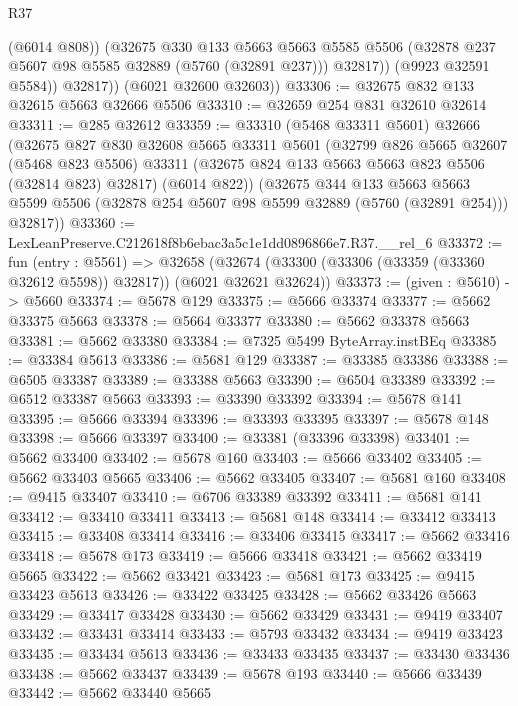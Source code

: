 \begin{lexlean}{R37}
\begin{coremodule}
                (@6014 @808))
              (@32675
                @330
                @133
                @5663
                @5663
                @5585
                @5506
                (@32878 @237 @5607 @98 @5585 @32889 (@5760 (@32891 @237)))
                @32817))
            (@9923 @32591 @5584))
          @32817))
      (@6021 @32600 @32603))
@33306 := @32675 @832 @133 @32615 @5663 @32666 @5506
@33310 := @32659 @254 @831 @32610 @32614
@33311 := @285 @32612
@33359 := @33310
    (@5468 @33311 @5601)
    @32666
    (@32675
      @827
      @830
      @32608
      @5665
      @33311
      @5601
      (@32799
        @826
        @5665
        @32607
        (@5468 @823 @5506)
        @33311
        (@32675 @824 @133 @5663 @5663 @823 @5506 (@32814 @823) @32817)
        (@6014 @822))
      (@32675
        @344
        @133
        @5663
        @5663
        @5599
        @5506
        (@32878 @254 @5607 @98 @5599 @32889 (@5760 (@32891 @254)))
        @32817))
@33360 := LexLeanPreserve.C212618f8b6ebac3a5c1e1dd0896866e7.R37.__rel_6
@33372 := fun (entry : @5561) =>
  @32658 (@32674 (@33300 (@33306 (@33359 (@33360 @32612 @5598)) @32817)) (@6021 @32621 @32624))
@33373 := (given : @5610) -> @5660
@33374 := @5678 @129
@33375 := @5666 @33374
@33377 := @5662 @33375 @5663
@33378 := @5664 @33377
@33380 := @5662 @33378 @5663
@33381 := @5662 @33380
@33384 := @7325 @5499 ByteArray.instBEq
@33385 := @33384 @5613
@33386 := @5681 @129
@33387 := @33385 @33386
@33388 := @6505 @33387
@33389 := @33388 @5663
@33390 := @6504 @33389
@33392 := @6512 @33387 @5663
@33393 := @33390 @33392
@33394 := @5678 @141
@33395 := @5666 @33394
@33396 := @33393 @33395
@33397 := @5678 @148
@33398 := @5666 @33397
@33400 := @33381 (@33396 @33398)
@33401 := @5662 @33400
@33402 := @5678 @160
@33403 := @5666 @33402
@33405 := @5662 @33403 @5665
@33406 := @5662 @33405
@33407 := @5681 @160
@33408 := @9415 @33407
@33410 := @6706 @33389 @33392
@33411 := @5681 @141
@33412 := @33410 @33411
@33413 := @5681 @148
@33414 := @33412 @33413
@33415 := @33408 @33414
@33416 := @33406 @33415
@33417 := @5662 @33416
@33418 := @5678 @173
@33419 := @5666 @33418
@33421 := @5662 @33419 @5665
@33422 := @5662 @33421
@33423 := @5681 @173
@33425 := @9415 @33423 @5613
@33426 := @33422 @33425
@33428 := @5662 @33426 @5663
@33429 := @33417 @33428
@33430 := @5662 @33429
@33431 := @9419 @33407
@33432 := @33431 @33414
@33433 := @5793 @33432
@33434 := @9419 @33423
@33435 := @33434 @5613
@33436 := @33433 @33435
@33437 := @33430 @33436
@33438 := @5662 @33437
@33439 := @5678 @193
@33440 := @5666 @33439
@33442 := @5662 @33440 @5665

\end{coremodule}
\end{lexlean}
